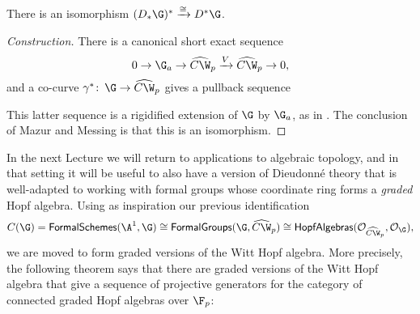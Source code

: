 \begin{corollary}
There is an isomorphism $(D_* \G)^* \xrightarrow\cong D^* \G$.
\end{corollary}
\begin{proof}[Construction]
There is a canonical short exact sequence \[0 \to \G_a \to \widehat{C\W}_p \xrightarrow{V} \widehat{C\W}_p \to 0,\] and a co-curve $\gamma^*\co \G \to \widehat{C\W}_p$ gives a pullback sequence
\begin{center}
\end{center}
This latter sequence is a rigidified extension of $\G$ by $\G_a$, as in .  The conclusion of Mazur and Messing is that this is an isomorphism.
\end{proof}









In the next Lecture we will return to applications to algebraic topology, and in that setting it will be useful to also have a version of Dieudonn\'e theory that is well-adapted to working with formal groups whose coordinate ring forms a \emph{graded} Hopf algebra.  Using as inspiration our previous identification \[C(\G) = \CatOf{FormalSchemes}(\A^1, \G) \cong \CatOf{FormalGroups}(\G, \widehat{C\W}_p) \cong \CatOf{HopfAlgebras}(\sheaf O_{\widehat{C\W}_p}, \sheaf O_{\G}),\] we are moved to form graded versions of the Witt Hopf algebra.  More precisely, the following theorem says that there are graded versions of the Witt Hopf algebra that give a sequence of projective generators for the category of connected graded Hopf algebras over $\F_p$:

